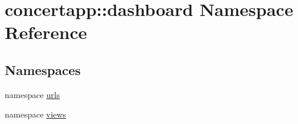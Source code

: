 \hypertarget{namespaceconcertapp_1_1dashboard}{
\section{concertapp::dashboard Namespace Reference}
\label{namespaceconcertapp_1_1dashboard}
}
\subsection*{Namespaces}
\begin{DoxyCompactItemize}
\item 
namespace \hyperlink{namespaceconcertapp_1_1dashboard_1_1urls}{urls}
\item 
namespace \hyperlink{namespaceconcertapp_1_1dashboard_1_1views}{views}
\end{DoxyCompactItemize}
